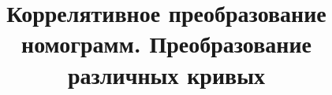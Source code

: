 \documentclass[a5paper]{article}
\begin{document}
\title{Коррелятивное преобразование номограмм. Преобразование различных кривых}

\stealcurrent
\end{document}
